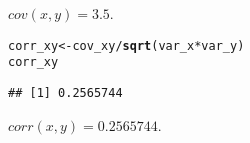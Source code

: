 \documentclass[11pt, a4paper]{article}\usepackage[]{graphicx}\usepackage[]{xcolor}
\makeatletter
\newcommand{\hlopt}[1]{\textcolor[rgb]{0,0,0}{#1}}%
\newcommand{\hldef}[1]{\textcolor[rgb]{0.345,0.345,0.345}{#1}}%
\newcommand{\hlkwb}[1]{\textcolor[rgb]{0.69,0.353,0.396}{#1}}%
\newcommand{\hlkwd}[1]{\textcolor[rgb]{0.737,0.353,0.396}{\textbf{#1}}}%
\newenvironment{kframe}{%
 \def\at@end@of@kframe{}%
 \ifinner\ifhmode%
  \def\at@end@of@kframe{\end{minipage}}%
  \begin{minipage}{\columnwidth}%
 \fi\fi%
 \def\FrameCommand##1{\hskip\@totalleftmargin \hskip-\fboxsep
 \colorbox{shadecolor}{##1}\hskip-\fboxsep
     \hskip-\linewidth \hskip-\@totalleftmargin \hskip\columnwidth}%
 \MakeFramed {\advance\hsize-\width
   \@totalleftmargin\z@ \linewidth\hsize
   \@setminipage}}%
 {\par\unskip\endMakeFramed%
 \at@end@of@kframe}
\newenvironment{knitrout}{}{} %
\makeatother
\begin{document}
$cov(x, y) = 3.5$.

\begin{knitrout}
\color{fgcolor}\begin{kframe}
\begin{alltt}
\hldef{corr_xy} \hlkwb{<-} \hldef{cov_xy} \hlopt{/} \hlkwd{sqrt}\hldef{(var_x} \hlopt{*} \hldef{var_y)}
\hldef{corr_xy}
\end{alltt}
\begin{verbatim}
## [1] 0.2565744
\end{verbatim}
\end{kframe}
\end{knitrout}

$corr(x, y) = 0.2565744$.
\end{document}
